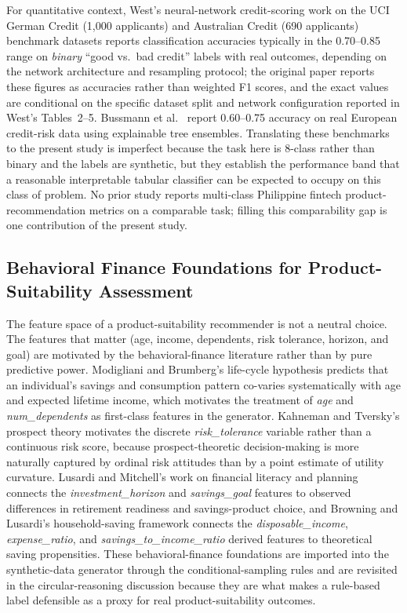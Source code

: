 \documentclass{icsthesis}
\begin{document}
\begin{mainmatter}
                For quantitative context, West's \cite{ref56} neural-network credit-scoring work on the UCI German Credit (1{,}000 applicants) and Australian Credit (690 applicants) benchmark datasets reports classification accuracies typically in the 0.70--0.85 range on \emph{binary} ``good vs.\ bad credit'' labels with real outcomes, depending on the network architecture and resampling protocol; the original paper reports these figures as accuracies rather than weighted F1 scores, and the exact values are conditional on the specific dataset split and network configuration reported in West's Tables~2--5. Bussmann et al.\ \cite{ref14} report 0.60--0.75 accuracy on real European credit-risk data using explainable tree ensembles. Translating these benchmarks to the present study is imperfect because the task here is 8-class rather than binary and the labels are synthetic, but they establish the performance band that a reasonable interpretable tabular classifier can be expected to occupy on this class of problem. No prior study reports multi-class Philippine fintech product-recommendation metrics on a comparable task; filling this comparability gap is one contribution of the present study.

			\subsection{Behavioral Finance Foundations for Product-Suitability Assessment}
				The feature space of a product-suitability recommender is not a neutral choice. The features that matter (age, income, dependents, risk tolerance, horizon, and goal) are motivated by the behavioral-finance literature rather than by pure predictive power. Modigliani and Brumberg's life-cycle hypothesis \cite{ref65} predicts that an individual's savings and consumption pattern co-varies systematically with age and expected lifetime income, which motivates the treatment of \emph{age} and \emph{num\_dependents} as first-class features in the generator. Kahneman and Tversky's prospect theory \cite{ref62} motivates the discrete \emph{risk\_tolerance} variable rather than a continuous risk score, because prospect-theoretic decision-making is more naturally captured by ordinal risk attitudes than by a point estimate of utility curvature. Lusardi and Mitchell's \cite{ref43} work on financial literacy and planning connects the \emph{investment\_horizon} and \emph{savings\_goal} features to observed differences in retirement readiness and savings-product choice, and Browning and Lusardi's \cite{ref55} household-saving framework connects the \emph{disposable\_income}, \emph{expense\_ratio}, and \emph{savings\_to\_income\_ratio} derived features to theoretical saving propensities. These behavioral-finance foundations are imported into the synthetic-data generator through the conditional-sampling rules and are revisited in the circular-reasoning discussion because they are what makes a rule-based label defensible as a proxy for real product-suitability outcomes.


\end{mainmatter}
\end{document}
